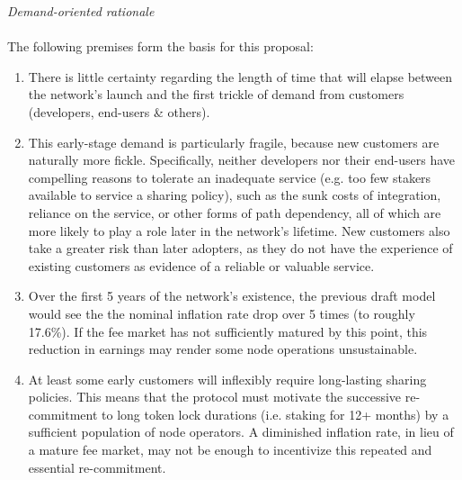 \documentclass[8pt]{article}
\begin{document}
\textit{Demand-oriented rationale}
\\\\
The following premises form the basis for this proposal: 
\begin{enumerate}
\item There is little certainty regarding the length of time that will elapse between the network's launch and the first trickle of demand from customers (developers, end-users \& others).
\item This early-stage demand is particularly fragile, because new customers are naturally more fickle. Specifically, neither developers nor their end-users have compelling reasons to tolerate an inadequate service (e.g. too few stakers available to service a sharing policy), such as the sunk costs of integration, reliance on the service, or other forms of path dependency, all of which are more likely to play a role later in the network's lifetime. New customers also take a greater risk than later adopters, as they do not have the experience of existing customers as evidence of a reliable or valuable service.
\item Over the first 5 years of the network's existence, the previous draft model would see the the nominal inflation rate drop over 5 times (to roughly 17.6\%). If the fee market has not sufficiently matured by this point, this reduction in earnings may render some node operations unsustainable. 
\item At least some early customers will inflexibly require long-lasting sharing policies. This means that the protocol must motivate the successive re-commitment to long token lock durations (i.e. staking for 12+ months) by a sufficient population of node operators. A diminished inflation rate, in lieu of a mature fee market, may not be enough to incentivize this repeated and essential re-commitment. 
\end{enumerate}
\end{document}
